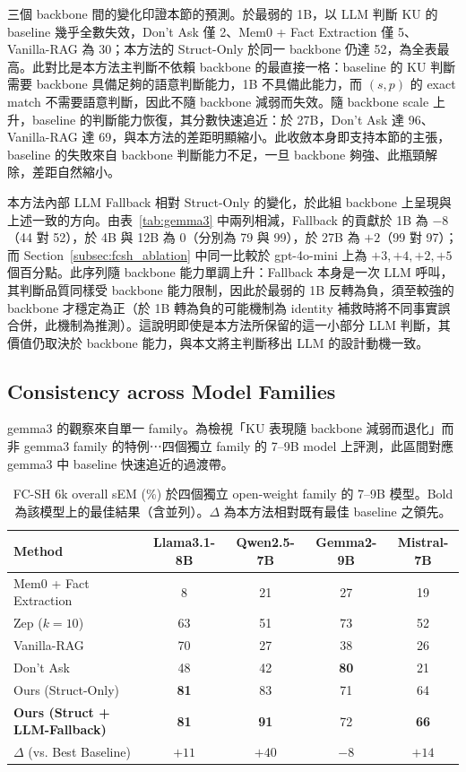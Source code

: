 三個 backbone 間的變化印證本節的預測。於最弱的 1B，以 LLM 判斷 KU 的 baseline 幾乎全數失效，Don't Ask 僅 2、Mem0 + Fact Extraction 僅 5、Vanilla-RAG 為 30；本方法的 Struct-Only 於同一 backbone 仍達 52，為全表最高。此對比是本方法主判斷不依賴 backbone 的最直接一格：baseline 的 KU 判斷需要 backbone 具備足夠的語意判斷能力，1B 不具備此能力，而 $(s, p)$ 的 exact match 不需要語意判斷，因此不隨 backbone 減弱而失效。隨 backbone scale 上升，baseline 的判斷能力恢復，其分數快速追近：於 27B，Don't Ask 達 96、Vanilla-RAG 達 69，與本方法的差距明顯縮小。此收斂本身即支持本節的主張，baseline 的失敗來自 backbone 判斷能力不足，一旦 backbone 夠強、此瓶頸解除，差距自然縮小。
 
本方法內部 LLM Fallback 相對 Struct-Only 的變化，於此組 backbone 上呈現與上述一致的方向。由表~\ref{tab:gemma3} 中兩列相減，Fallback 的貢獻於 1B 為 $-8$（44 對 52），於 4B 與 12B 為 $0$（分別為 79 與 99），於 27B 為 $+2$（99 對 97）；而 Section~\ref{subsec:fcsh_ablation} 中同一比較於 gpt-4o-mini 上為 $+3, +4, +2, +5$ 個百分點。此序列隨 backbone 能力單調上升：Fallback 本身是一次 LLM 呼叫，其判斷品質同樣受 backbone 能力限制，因此於最弱的 1B 反轉為負，須至較強的 backbone 才穩定為正（於 1B 轉為負的可能機制為 identity 補救時將不同事實誤合併，此機制為推測）。這說明即使是本方法所保留的這一小部分 LLM 判斷，其價值仍取決於 backbone 能力，與本文將主判斷移出 LLM 的設計動機一致。
 
\subsection{Consistency across Model Families}
\label{subsec:crossfamily}
 
gemma3 的觀察來自單一 family。為檢視「KU 表現隨 backbone 減弱而退化」而非 gemma3 family 的特例⋯四個獨立 family 的 7--9B model 上評測，此區間對應 gemma3 中 baseline 快速追近的過渡帶。
 
\begin{table}[!htb]
\centering
\caption{FC-SH 6k overall sEM (\%) 於四個獨立 open-weight family 的 7--9B 模型。Bold 為該模型上的最佳結果（含並列）。$\Delta$ 為本方法相對既有最佳 baseline 之領先。}
\label{tab:crossfamily}
\small
\begin{tabular}{lcccc}
\toprule
Method & Llama3.1-8B & Qwen2.5-7B & Gemma2-9B & Mistral-7B \\
\midrule
Mem0 + Fact Extraction & 8 & 21 & 27 & 19 \\
Zep ($k=10$) & 63 & 51 & 73 & 52 \\
Vanilla-RAG & 70 & 27 & 38 & 26 \\
Don't Ask & 48 & 42 & \textbf{80} & 21 \\
\midrule
Ours (Struct-Only) & \textbf{81} & 83 & 71 & 64 \\
\textbf{Ours (Struct + LLM-Fallback)} & \textbf{81} & \textbf{91} & 72 & \textbf{66} \\
\midrule
$\Delta$ (vs. Best Baseline) & $+11$ & $+40$ & $-8$ & $+14$ \\
\bottomrule
\end{tabular}
\end{table}

